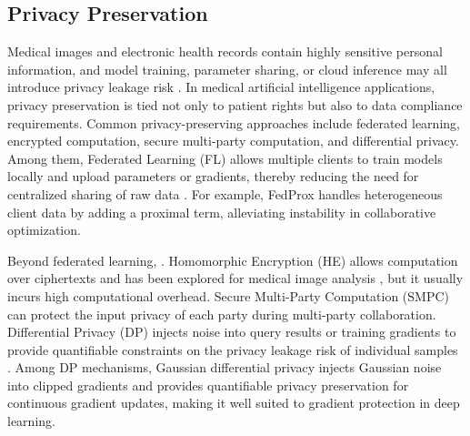 
\subsection{Privacy Preservation}

Medical images and electronic health records contain highly sensitive personal information, and model training, parameter sharing, or cloud inference may all introduce privacy leakage risk \cite{_Ref213950358}. In medical artificial intelligence applications, privacy preservation is tied not only to patient rights but also to data compliance requirements. Common privacy-preserving approaches include federated learning, encrypted computation, secure multi-party computation, and differential privacy. Among them, Federated Learning (FL) allows multiple clients to train models locally and upload parameters or gradients, thereby reducing the need for centralized sharing of raw data \cite{_Ref213950376}. For example, FedProx \cite{_Ref213950391} handles heterogeneous client data by adding a proximal term, alleviating instability in collaborative optimization.

Beyond federated learning, . Homomorphic Encryption (HE) allows computation over ciphertexts \cite{_Ref213950427} and has been explored for medical image analysis \cite{_Ref213950433}, but it usually incurs high computational overhead. Secure Multi-Party Computation (SMPC) \cite{_Ref213950438} can protect the input privacy of each party during multi-party collaboration. Differential Privacy (DP) injects noise into query results or training gradients to provide quantifiable constraints on the privacy leakage risk of individual samples \cite{_Ref213950443}. Among DP mechanisms, Gaussian differential privacy \cite{_Ref213950449} injects Gaussian noise into clipped gradients and provides quantifiable privacy preservation for continuous gradient updates, making it well suited to gradient protection in deep learning.

